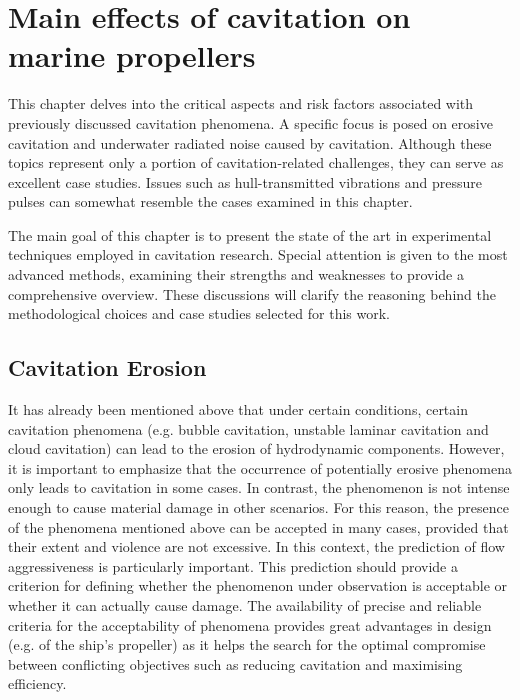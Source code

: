 \chapter{Main effects of cavitation on marine propellers}
\label{chap:chapter3}

This chapter delves into the critical aspects and risk factors associated with previously discussed cavitation phenomena. A specific focus is posed on erosive cavitation and underwater radiated noise caused by cavitation.
Although these topics represent only a portion of cavitation-related challenges, they can serve as excellent case studies. Issues such as hull-transmitted vibrations and pressure pulses can somewhat resemble the cases examined in this chapter.

The main goal of this chapter is to present the state of the art in experimental techniques employed in cavitation research. Special attention is given to the most advanced methods, examining their strengths and weaknesses to provide a comprehensive overview.
These discussions will clarify the reasoning behind the methodological choices and case studies selected for this work. 

\section{Cavitation Erosion}

It has already been mentioned above that under certain conditions, certain cavitation phenomena (e.g. bubble cavitation, unstable laminar cavitation and cloud cavitation) can lead to the erosion of hydrodynamic components. However, it is important to emphasize that the occurrence of potentially erosive phenomena only leads to cavitation in some cases. In contrast, the phenomenon is not intense enough to cause material damage in other scenarios.
For this reason, the presence of the phenomena mentioned above can be accepted in many cases, provided that their extent and violence are not excessive. 
In this context, the prediction of flow aggressiveness is particularly important. This prediction should provide a criterion for defining whether the phenomenon under observation is acceptable or whether it can actually cause damage. 
The availability of precise and reliable criteria for the acceptability of phenomena provides great advantages in design (e.g. of the ship's propeller) as it helps the search for the optimal compromise between conflicting objectives such as reducing cavitation and maximising efficiency.

